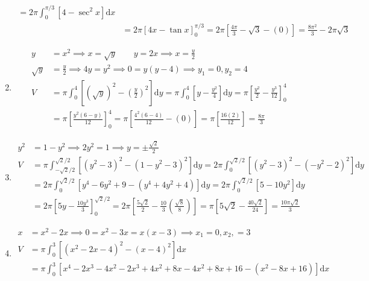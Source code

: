 \documentclass[12pt, A4]{report}
\renewcommand{\d}{\text{d}}
\begin{document}
\begin{enumerate}
\begin{align*}
								= 2\pi\int_0^{\pi/3}\left[4 - \sec^2 x\right]\d x \\
							&= 2\pi[4x - \tan x]_0^{\pi/3} = 2\pi\left[\frac{4\pi}{3} - \sqrt{3} - (0)\right] = \frac{8\pi^2}{3} - 2\pi\sqrt{3}
					\end{align*}
				\item
					\begin{align*}
						y &= x^2 \implies x = \sqrt{y} \qquad 
								y = 2x \implies x = \frac{y}{2} \\
						\sqrt{y} &= \frac{y}{2} 
								\implies 4y = y^2 
								\implies 0 = y(y - 4) 
								\implies y_1 = 0, y_2 = 4 \\
						V &= \pi\int_0^4\left[\left(\sqrt{y}\right)^2 - \left(\frac{y}{2}\right)^2\right]\d y
							 	= \pi\int_0^4\left[y - \frac{y^2}{4}\right]\d y
							 	= \pi\left[\frac{y^2}{2} - \frac{y^3}{12}\right]_0^4 \\
							 &= \pi\left[\frac{y^2(6 - y)}{12}\right]_0^4
							 	= \pi\left[\frac{4^2(6 - 4)}{12} - (0)\right]
							 	= \pi\left[\frac{16(2)}{12}\right]
							 	= \frac{8\pi}{3}
					\end{align*}
				\item
					\begin{align*}
						y^2 &= 1 - y^2 \implies 2y^2 = 1 \implies y = \pm\frac{\sqrt{2}}{2} \\
						V &= \pi\int_{-\sqrt{2}/2}^{\sqrt{2}/2}\left[\left(y^2 - 3\right)^2 -\left(1 - y^2 - 3\right)^2\right]\d y
								= 2\pi\int_0^{\sqrt{2}/2}\left[\left(y^2 - 3\right)^2 - \left(-y^2 - 2\right)^2\right]\d y \\
							&= 2\pi\int_0^{\sqrt{2}/2}\left[y^4 - 6y^2 + 9 - \left(y^4 + 4y^2 + 4\right)\right]\d y
								= 2\pi\int_0^{\sqrt{2}/2}\left[5 - 10y^2\right]\d y \\
							&= 2\pi\left[5y - \frac{10y^3}{3}\right]_0^{\sqrt{2}/2}
								= 2\pi\left[\frac{5\sqrt{2}}{2} - \frac{10}{3}\left(\frac{\sqrt{8}}{8}\right)\right]
								= \pi\left[5\sqrt{2} - \frac{40\sqrt{2}}{24}\right]
								= \frac{10\pi\sqrt{2}}{3}
					\end{align*}
				\item
					\begin{align*}
						x &= x^2 - 2x 
								\implies 0 = x^2 - 3x = x(x - 3) 
								\implies x_1 = 0, x_2, = 3 \\
						V &= \pi\int_0^3\left[\left(x^2 - 2x - 4\right)^2 - (x - 4)^2\right]\d x \\
							&= \pi\int_0^3\left[x^4 - 2x^3 - 4x^2 - 2x^3 + 4x^2 + 8x - 4x^2 + 8x + 16 - \left(x^2 - 8x + 16\right) \right]\d x \\

\end{align*}
\end{enumerate}
\end{document}
